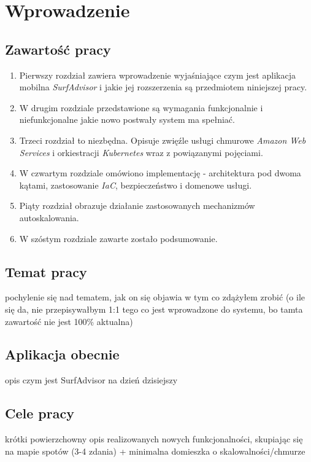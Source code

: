 \chapter{Wprowadzenie}
\label{cha:intro}

\section{Zawartość pracy}
\begin{enumerate}
    \item
    Pierwszy rozdział zawiera wprowadzenie wyjaśniające czym jest aplikacja mobilna \emph{SurfAdvisor} i jakie jej rozszerzenia są przedmiotem niniejszej pracy.

    \item
    W drugim rozdziale przedstawione są wymagania funkcjonalnie i niefunkcjonalne jakie nowo postwały system ma spełniać.

    \item
    Trzeci rozdział to niezbędna. Opisuje zwięźle usługi chmurowe \emph{Amazon Web Services} i orkiestracji \emph{Kubernetes} wraz z powiązanymi pojęciami.

    \item
    W czwartym rozdziale omówiono implementację - architektura pod dwoma kątami, zastosowanie \emph{IaC}, bezpieczeństwo i domenowe usługi.

    \item
    Piąty rozdział obrazuje działanie zastosowanych mechanizmów autoskalowania.

    \item
    W szóstym rozdziale zawarte zostało podsumowanie.
\end{enumerate} 


\section{Temat pracy}
pochylenie się nad tematem, jak on się objawia w tym co zdążyłem zrobić 
(o ile się da, nie przepisywałbym 1:1 tego co jest wprowadzone do systemu, bo tamta zawartość nie jest 100\% aktualna)

\section{Aplikacja obecnie}
opis czym jest SurfAdvisor na dzień dzisiejszy

\section{Cele pracy}
krótki powierzchowny opis realizowanych nowych funkcjonalności, 
skupiając się na mapie spotów (3-4 zdania) + minimalna domieszka o skalowalności/chmurze